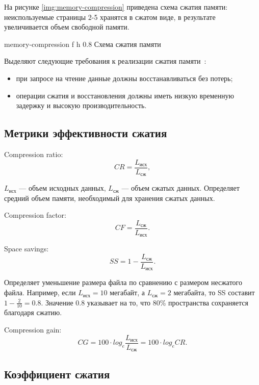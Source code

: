 На рисунке \ref{img:memory-compression} приведена схема сжатия памяти: неиспользуемые страницы 2-5 хранятся в сжатом виде, в результате увеличивается объем свободной памяти.

    {memory-compression}
    {f}
    {h}
    {0.8\textwidth}
    {Схема сжатия памяти}

Выделяют следующие требования к реализации сжатия памяти~\cite{compression-requirements}:

\begin{itemize}
	\item при запросе на чтение данные должны восстанавливаться без потерь;
	\item операции сжатия и восстановления должны иметь низкую временную задержку и высокую производительность.
\end{itemize}

\subsection{Метрики эффективности сжатия}

Compression ratio:
\begin{equation}
	CR = \frac{L_{\text{исх}}}{L_{\text{сж}}},
\end{equation}

 $L_{\text{исх}}$ --- объем исходных данных, $L_{\text{сж}}$ --- объем сжатых данных. Определяет средний объем памяти, необходимый для хранения сжатых данных.

Compression factor:
\begin{equation}
	CF = \frac{L_{\text{сж}}}{L_{\text{исх}}}.
\end{equation}

Space savings:
\begin{equation}
	SS = 1 - \frac{L_{\text{сж}}}{L_{\text{исх}}}.
\end{equation}

Определяет уменьшение размера файла по сравнению с размером несжатого файла. Например, если $L_{\text{исх}} = 10$ мегабайт, а $L_{\text{сж}} = 2$ мегабайта, то SS составит $1 - \frac{2}{10} = 0.8$. Значение 0.8 указывает на то, что 80\% пространства сохраняется благодаря сжатию.

Compression gain:
\begin{equation}
	CG = 100 \cdot log_e \frac{L_{\text{исх}}}{L_{\text{сж}}} = 100 \cdot log_e CR.
\end{equation}

\subsection{Коэффициент сжатия}

